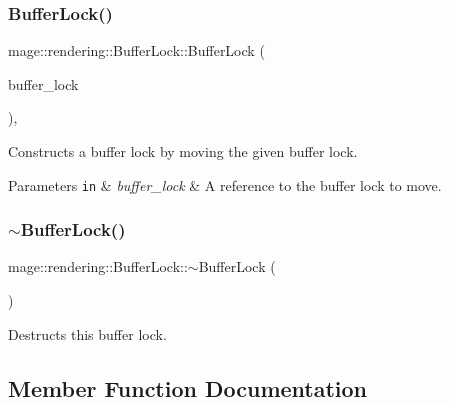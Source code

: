 \subsubsection{\texorpdfstring{Buffer\+Lock()}{BufferLock()}\hspace{0.1cm}{\footnotesize\ttfamily [3/3]}}
{\footnotesize\ttfamily mage\+::rendering\+::\+Buffer\+Lock\+::\+Buffer\+Lock (\begin{DoxyParamCaption}\item[{\mbox{\hyperlink{classmage_1_1rendering_1_1_buffer_lock}{Buffer\+Lock}} \&\&}]{buffer\+\_\+lock }\end{DoxyParamCaption})\hspace{0.3cm}{\ttfamily [default]}, {\ttfamily [noexcept]}}

Constructs a buffer lock by moving the given buffer lock.


\begin{DoxyParams}[1]{Parameters}
\mbox{\tt in}  & {\em buffer\+\_\+lock} & A reference to the buffer lock to move. \\
\hline
\end{DoxyParams}
\mbox{\label{classmage_1_1rendering_1_1_buffer_lock_ae7ce340c09dc0698aedf33aeb66b14c6}} 
\subsubsection{\texorpdfstring{$\sim$\+Buffer\+Lock()}{~BufferLock()}}
{\footnotesize\ttfamily mage\+::rendering\+::\+Buffer\+Lock\+::$\sim$\+Buffer\+Lock (\begin{DoxyParamCaption}{ }\end{DoxyParamCaption})}

Destructs this buffer lock. 

\subsection{Member Function Documentation}
\mbox{\label{classmage_1_1rendering_1_1_buffer_lock_a88693ae3717c7098d5cc2313cd16b8a6}} 
